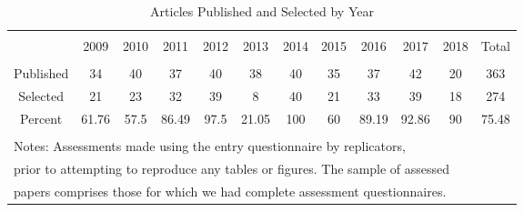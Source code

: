 
\begin{table}[!htbp] \centering 
  \caption{Articles Published and Selected by Year} 
  \label{tab:Selection} 
\footnotesize 
\begin{tabular}{@{\extracolsep{0.4pt}} cccccccccccc} 
\\[-1.8ex]\hline 
\hline \\[-1.8ex] 
  & 2009 & 2010 & 2011 & 2012 & 2013 & 2014 & 2015 & 2016 & 2017 & 2018 & Total \\ 
\hline \\[-1.8ex] 
Published & 34 & 40 & 37 & 40 & 38 & 40 & 35 & 37 & 42 & 20 & 363 \\ 
Selected & 21 & 23 & 32 & 39 & 8 & 40 & 21 & 33 & 39 & 18 & 274 \\ 
Percent & 61.76 & 57.5 & 86.49 & 97.5 & 21.05 & 100 & 60 & 89.19 & 92.86 & 90 & 75.48 \\ 
\hline \\[-1.8ex] 
\multicolumn{12}{l}{Notes: Assessments made using the entry questionnaire by replicators,} \\ 
\multicolumn{12}{l}{prior to attempting to reproduce any tables or figures. The sample of assessed} \\ 
\multicolumn{12}{l}{papers comprises those for which we had complete assessment questionnaires.} \\ 
\end{tabular} 
\end{table} 
